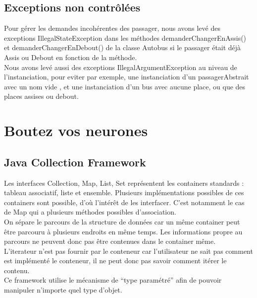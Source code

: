 \documentclass[12pt,a4paper]{article}
\begin{document}
\subsection{Exceptions non contrôlées}
Pour gérer les demandes incohérentes des passager, nous avons levé des exceptions IllegalStateException
dans les méthodes demanderChangerEnAssis() et demanderChangerEnDebout() de la classe Autobus si
le passager était déjà Assis ou Debout en fonction de la méthode.\\

Nous avons levé aussi des exceptions IllegalArgumentException au niveau de l'instanciation, pour eviter par exemple, une instanciation d'un passagerAbstrait avec un nom vide , et une instanciation d'un bus avec aucune place, ou que des places assises ou debout.\\



\section{Boutez vos neurones}
\subsection{Java Collection Framework}

Les interfaces Collection, Map, List, Set représentent les containers standards : tableau associatif, liste et
ensemble. Plusieurs implémentations possibles de ces containers sont possible, d'où
l'intérêt de les interfacer. C'est notamment le cas de Map qui a plusieurs méthodes
possibles d'association.\\

On sépare le parcours de la structure de données car un même container peut être parcouru à plusieurs endroits en même temps. Les
informations propre au parcours ne peuvent donc pas être contenues dans le container
même.\\

L'iterateur n'est pas fournir par le conteneur car l'utilisateur ne sait pas comment est implémenté le conteneur, il ne peut donc pas
savoir comment itérer le contenu.\\

Ce framework utilise le mécanisme de “type paramétré” afin de pouvoir manipuler
n'importe quel type d'objet.\\
\end{document}
